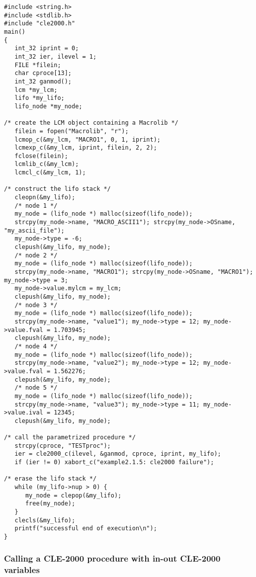 \begin{verbatim}
#include <string.h>
#include <stdlib.h>
#include "cle2000.h"
main()
{
   int_32 iprint = 0;
   int_32 ier, ilevel = 1;
   FILE *filein;
   char cproce[13];
   int_32 ganmod();
   lcm *my_lcm;
   lifo *my_lifo;
   lifo_node *my_node;
    
/* create the LCM object containing a Macrolib */
   filein = fopen("Macrolib", "r");
   lcmop_c(&my_lcm, "MACRO1", 0, 1, iprint);
   lcmexp_c(&my_lcm, iprint, filein, 2, 2);
   fclose(filein);
   lcmlib_c(&my_lcm);
   lcmcl_c(&my_lcm, 1);
    
/* construct the lifo stack */
   cleopn(&my_lifo);
   /* node 1 */
   my_node = (lifo_node *) malloc(sizeof(lifo_node));
   strcpy(my_node->name, "MACRO_ASCII1"); strcpy(my_node->OSname, "my_ascii_file");
   my_node->type = -6;
   clepush(&my_lifo, my_node);
   /* node 2 */
   my_node = (lifo_node *) malloc(sizeof(lifo_node));
   strcpy(my_node->name, "MACRO1"); strcpy(my_node->OSname, "MACRO1"); my_node->type = 3;
   my_node->value.mylcm = my_lcm;
   clepush(&my_lifo, my_node);
   /* node 3 */
   my_node = (lifo_node *) malloc(sizeof(lifo_node));
   strcpy(my_node->name, "value1"); my_node->type = 12; my_node->value.fval = 1.703945;
   clepush(&my_lifo, my_node);
   /* node 4 */
   my_node = (lifo_node *) malloc(sizeof(lifo_node));
   strcpy(my_node->name, "value2"); my_node->type = 12; my_node->value.fval = 1.562276;
   clepush(&my_lifo, my_node);
   /* node 5 */
   my_node = (lifo_node *) malloc(sizeof(lifo_node));
   strcpy(my_node->name, "value3"); my_node->type = 11; my_node->value.ival = 12345;
   clepush(&my_lifo, my_node);
 
/* call the parametrized procedure */
   strcpy(cproce, "TESTproc");
   ier = cle2000_c(ilevel, &ganmod, cproce, iprint, my_lifo);
   if (ier != 0) xabort_c("example2.1.5: cle2000 failure");

/* erase the lifo stack */
   while (my_lifo->nup > 0) {
      my_node = clepop(&my_lifo);
      free(my_node);
   }
   clecls(&my_lifo);
   printf("successful end of execution\n");
}
\end{verbatim}

\subsubsection {Calling a CLE-2000 procedure with in-out CLE-2000 variables}

